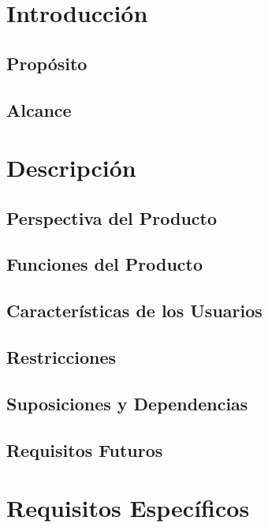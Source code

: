 \section{Introducción}
    \subsection{Propósito}
        
    \subsection{Alcance}
        
\section{Descripción}
    \subsection{Perspectiva del Producto}
        
    \subsection{Funciones del Producto}
        
    \subsection{Características de los Usuarios}
        
    \subsection{Restricciones}
        
    \subsection{Suposiciones y Dependencias}
        
    \subsection{Requisitos Futuros}

\section{Requisitos Específicos}
